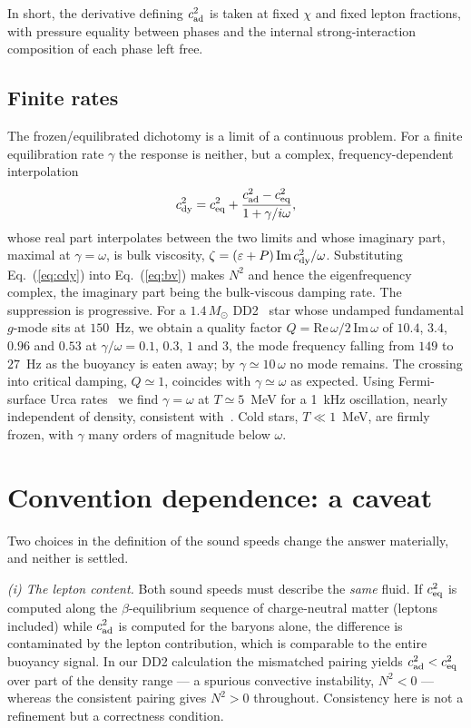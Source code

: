 \documentclass[aps,prd,twocolumn,superscriptaddress,nofootinbib,10pt]{revtex4-2}
\begin{document}
In short, the derivative defining $c_{\rm ad}^{2}$ is taken at fixed $\chi$ and
fixed lepton fractions, with pressure equality between phases and the internal
strong-interaction composition of each phase left free.

\subsection{Finite rates}
\label{sec:rates}

The frozen/equilibrated dichotomy is a limit of a continuous problem. For a
finite equilibration rate $\gamma$ the response is neither, but a complex,
frequency-dependent interpolation~\cite{Counsell2025}
\begin{equation}
  c_{\rm dy}^{2} = c_{\rm eq}^{2}
    + \frac{c_{\rm ad}^{2}-c_{\rm eq}^{2}}{1+\gamma/i\omega},
  \label{eq:cdy}
\end{equation}
whose real part interpolates between the two limits and whose imaginary part,
maximal at $\gamma=\omega$, is bulk viscosity,
$\zeta=(\varepsilon+P)\,{\rm Im}\,c_{\rm dy}^{2}/\omega$. Substituting
Eq.~(\ref{eq:cdy}) into Eq.~(\ref{eq:bv}) makes $N^{2}$ and hence the
eigenfrequency complex, the imaginary part being the bulk-viscous damping rate.
The suppression is progressive. For a $1.4\,M_{\odot}$ DD2~\cite{Typel2010}
star whose undamped fundamental $g$-mode sits at $150$~Hz, we obtain a quality
factor $Q=\mathrm{Re}\,\omega/2\,\mathrm{Im}\,\omega$ of $10.4$, $3.4$, $0.96$
and $0.53$ at $\gamma/\omega=0.1$, $0.3$, $1$ and $3$, the mode frequency
falling from $149$ to $27$~Hz as the buoyancy is eaten away; by
$\gamma\simeq10\,\omega$ no mode remains. The crossing into critical damping,
$Q\simeq1$, coincides with $\gamma\simeq\omega$ as expected. Using
Fermi-surface Urca rates~\cite{AlfordHarris2018,Alford2020} we find
$\gamma=\omega$ at $T\simeq5$~MeV for a 1~kHz oscillation, nearly independent
of density, consistent with~\cite{AlfordHarris2019}. Cold stars, $T\ll1$~MeV,
are firmly frozen, with $\gamma$ many orders of magnitude below $\omega$.

\section{Convention dependence: a caveat}

Two choices in the definition of the sound speeds change the answer materially,
and neither is settled.

\emph{(i) The lepton content.} Both sound speeds must describe the \emph{same}
fluid. If $c_{\rm eq}^{2}$ is computed along the $\beta$-equilibrium sequence of
charge-neutral matter (leptons included) while $c_{\rm ad}^{2}$ is computed for
the baryons alone, the difference is contaminated by the lepton contribution,
which is comparable to the entire buoyancy signal. In our DD2 calculation the
mismatched pairing yields $c_{\rm ad}^{2}<c_{\rm eq}^{2}$ over part of the
density range --- a spurious convective instability, $N^{2}<0$ --- whereas the
consistent pairing gives $N^{2}>0$ throughout. Consistency here is not a
refinement but a correctness condition.
\end{document}
